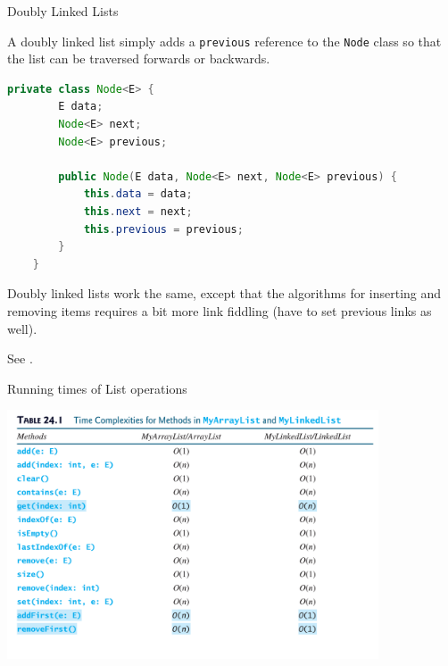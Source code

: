 \documentclass{beamer}
\begin{document}
\begin{frame}[fragile]{Doubly Linked Lists}


A doubly linked list simply adds a {\tt previous} reference to the {\tt Node} class so that the list can be traversed forwards or backwards.
\begin{lstlisting}[language=Java]
    private class Node<E> {
        E data;
        Node<E> next;
        Node<E> previous;

        public Node(E data, Node<E> next, Node<E> previous) {
            this.data = data;
            this.next = next;
            this.previous = previous;
        }
    }
\end{lstlisting}

Doubly linked lists work the same, except that the algorithms for inserting and removing items requires a bit more link fiddling (have to set previous links as well).

See .

\end{frame}
\begin{frame}[fragile]{Running times of List operations}
\vspace{.1in}
\begin{center}
\includegraphics[height=2.9in]{bigO-of-list-operations.png}
\end{center}

\end{frame}
\end{document}
